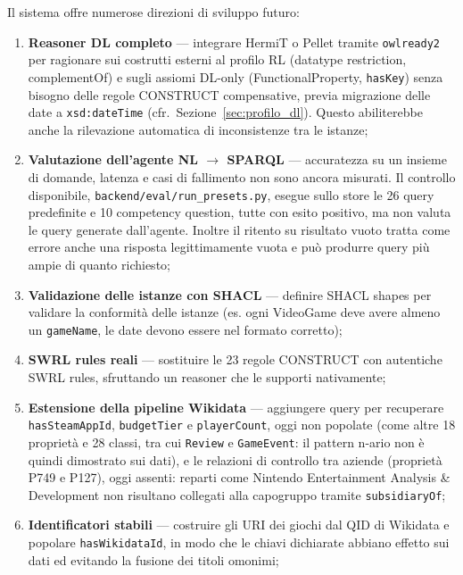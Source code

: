 Il sistema offre numerose direzioni di sviluppo futuro:

\begin{enumerate}[nosep]
  \item \textbf{Reasoner DL completo} --- integrare HermiT o Pellet tramite
    \texttt{owlready2} per ragionare sui costrutti esterni al profilo RL (datatype
    restriction, complementOf) e sugli assiomi DL-only (FunctionalProperty,
    \texttt{hasKey}) senza bisogno delle regole CONSTRUCT compensative, previa
    migrazione delle date a \texttt{xsd:dateTime} (cfr.~Sezione~\ref{sec:profilo_dl}). Questo abiliterebbe anche la rilevazione
    automatica di inconsistenze tra le istanze;
  \item \textbf{Valutazione dell'agente NL $\rightarrow$ SPARQL} --- accuratezza su un insieme di
    domande, latenza e casi di fallimento non sono ancora misurati. Il controllo disponibile,
    \texttt{backend/eval/\allowbreak run\_presets.py}, esegue sullo store le 26 query predefinite e 10 competency
    question, tutte con esito positivo, ma non valuta le query generate dall'agente. Inoltre il ritento su
    risultato vuoto tratta come errore anche una risposta legittimamente vuota e pu\`o produrre query pi\`u
    ampie di quanto richiesto;
  \item \textbf{Validazione delle istanze con SHACL} --- definire SHACL shapes per
    validare la conformit\`a delle istanze (es. ogni VideoGame deve avere
    almeno un \texttt{gameName}, le date devono essere nel formato corretto);
  \item \textbf{SWRL rules reali} --- sostituire le 23 regole CONSTRUCT con
    autentiche SWRL rules, sfruttando un reasoner che le supporti nativamente;
  \item \textbf{Estensione della pipeline Wikidata} --- aggiungere query per
    recuperare \texttt{hasSteamAppId}, \texttt{budgetTier} e \texttt{playerCount}, oggi non popolate
    (come altre 18 propriet\`a e 28 classi, tra cui \texttt{Review} e \texttt{GameEvent}: il pattern
    n-ario non \`e quindi dimostrato sui dati), e le relazioni di controllo tra aziende (propriet\`a P749 e P127), oggi
    assenti: reparti come Nintendo Entertainment Analysis \& Development non risultano collegati alla
    capogruppo tramite \texttt{subsidiaryOf};
  \item \textbf{Identificatori stabili} --- costruire gli URI dei giochi dal QID di Wikidata e
    popolare \texttt{hasWikidataId}, in modo che le chiavi dichiarate abbiano effetto sui dati ed
    evitando la fusione dei titoli omonimi;

\end{enumerate}

